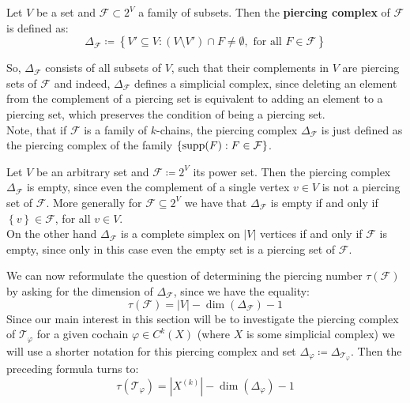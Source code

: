 \begin{defi}
Let \(V\) be a set and \(\mathcal{F}\subset 2^V\) a family of subsets. Then the \textbf{piercing complex} of \(\mathcal{F}\) is defined as:
\[
\Delta_{\mathcal{F}}\coloneqq \left\{V'\subseteq V:(V\setminus V')\cap F\neq\emptyset,\text{ for all }F\in\mathcal{F}\right\}
\]
\end{defi}
So, \(\Delta_{\mathcal{F}}\) consists of all subsets of \(V\), such that their complements in \(V\) are piercing sets of \(\mathcal{F}\) and indeed, \(\Delta_{\mathcal{F}}\) defines a simplicial complex, since deleting an element from the complement of a piercing set is equivalent to adding an element to a piercing set, which preserves the condition of being a piercing set.\\
Note, that if \(\mathcal{F}\) is a family of \(k\)-chains, the piercing complex \(\Delta_{\mathcal{F}}\) is just defined as the piercing complex of the family \(\{\mathrm{supp}(F):F\in\mathcal{F}\}\).

\begin{expl}
Let \(V\) be an arbitrary set and \(\mathcal{F}\coloneqq 2^V\) its power set. Then the piercing complex \(\Delta_{\mathcal{F}}\) is empty, since even the complement of a single vertex \(v\in V\) is not a piercing set of \(\mathcal{F}\). More generally for \(\mathcal{F}\subseteq 2^V\) we have that \(\Delta_{\mathcal{F}}\) is empty if and only if \(\left\{v\right\}\in\mathcal{F}\), for all \(v\in V\).\\
On the other hand \(\Delta_{\mathcal{F}}\) is a complete simplex on \(\left|V\right|\) vertices if and only if \(\mathcal{F}\) is empty, since only in this case even the empty set is a piercing set of \(\mathcal{F}\).
\end{expl}

We can now reformulate the question of determining the piercing number \(\tau(\mathcal{F})\) by asking for the dimension of \(\Delta_{\mathcal{F}}\), since we have the equality:
\[
\tau(\mathcal{F})=\left| V\right|-\dim(\Delta_{\mathcal{F}})-1
\]
Since our main interest in this section will be to investigate the piercing complex of \(\mathcal{T}_{\varphi}\) for a given cochain \(\varphi\in C^k(X)\) (where \(X\) is some simplicial complex) we will use a shorter notation for this piercing complex and set \(\Delta_{\varphi}\coloneqq \Delta_{\mathcal{T}_{\varphi}}\). Then the preceding formula turns to:
\[
\tau(\mathcal{T}_{\varphi})=|X^{(k)}|-\dim(\Delta_{\varphi})-1
\]

%

